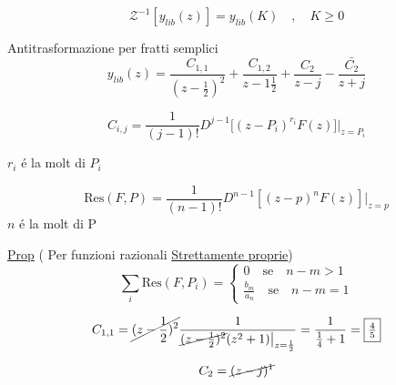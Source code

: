 \documentclass{article}
\begin{document}
\[ \mathcal{Z}^{-1}[ y_{lib}(z)] = y_{lib}(K) \quad , \quad K \ge 0 \]

Antitrasformazione per fratti semplici
\[ y_{lib}(z) = \frac{C_{1, 1}}{\left( z - \frac{1}{2}\right)^2} + \frac{C_{1, 2}}{z - 1\frac{1}{2}} + \frac{C_2}{z - j} - \frac{\bar{C_2}}{z+j} \]

\[ C_{i, j} = \frac{1}{(j-1)!} D^{j-1}\big[ (z-P_i)^{r_i} F(z)\big]\big|_{z=P_i} \]

$r_i$ \'e la molt di $P_i$

\[ \text{Res}(F, P) = \frac{1}{(n-1)!} D^{n-1}[(z-p)^n F(z)]\big|_{z=p} \]
$n$ \'e la molt di P

\underline{Prop} ( Per funzioni razionali \underline{Strettamente proprie})
\[
    \sum_i \text{Res}(F, P_i) = \begin{cases}
        0 \quad \text{se} \quad n-m > 1 \\
        \frac{b_m}{a_n} \quad \text{se} \quad n-m = 1
    \end{cases}
\]

\[ C_{1,1} = \cancel{(z - \frac{1}{2})^2} \frac{1}{\cancel{(z - \frac{1}{2})^2} (z^2 +1) \big|_{z=\frac{1}{2}}} = \frac{1}{\frac{1}{4} + 1} = \framebox{$\frac{4}{5}$} \]

\[ C_2 = \cancel{(z - j)^1} \]
\end{document}
